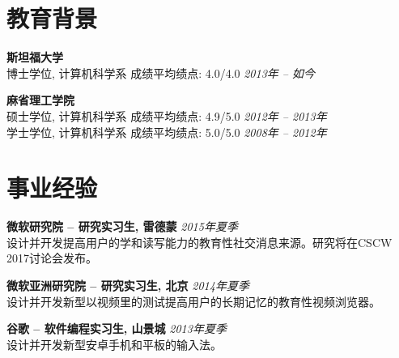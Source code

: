 \documentclass[margin,line]{resume}
\begin{document}
\vspace{-5.0mm}

\begin{resume}

\section{\mysidestyle 教育背景}

\textbf{斯坦福大学} \vspace{0mm}\\\vspace{0mm}%
博士学位, 计算机科学系  \hspace{4.5mm} 成绩平均绩点: 4.0/4.0 \hspace{5mm} \hfill \textsl{2013年 -- 如今}

\textbf{麻省理工学院} \vspace{0mm}\\\vspace{0mm}%
硕士学位, 计算机科学系 \hspace{4.5mm} 成绩平均绩点: 4.9/5.0 \hspace{10mm} \hfill \textsl{2012年 -- 2013年}\\\vspace{1mm}%
学士学位, 计算机科学系 \hspace{4.5mm} 成绩平均绩点: 5.0/5.0 \hfill \textsl{2008年 -- 2012年}\vspace{-0.8mm}

\section{\mysidestyle 事业经验}

\textbf{微软研究院 -- 研究实习生, 雷德蒙} \hspace{13.5mm} \hfill \textsl{2015年夏季}\\
设计并开发提高用户的学和读写能力的教育性社交消息来源。研究将在CSCW 2017讨论会发布。

\textbf{微软亚洲研究院 -- 研究实习生, 北京} \hspace{17.5mm} \hfill \textsl{2014年夏季}\\
设计并开发新型以视频里的测试提高用户的长期记忆的教育性视频浏览器。

\textbf{谷歌 -- 软件编程实习生, 山景城} \hspace{5mm} \hfill \textsl{2013年夏季}\\
设计并开发新型安卓手机和平板的输入法。


\end{resume}
\end{document}
